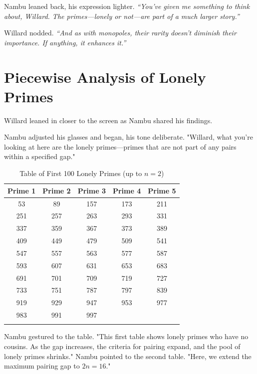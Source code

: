 Nambu leaned back, his expression lighter. \textit{``You’ve given me something to think about, Willard. The primes—lonely or not—are part of a much larger story.''}

Willard nodded. \textit{``And as with monopoles, their rarity doesn’t diminish their importance. If anything, it enhances it.''}


\section*{Piecewise Analysis of Lonely Primes}

Willard leaned in closer to the screen as Nambu shared his findings.

Nambu adjusted his glasses and began, his tone deliberate. "Willard, what you’re looking at here are the lonely primes—primes that are not part of any pairs within a specified gap."

\begin{longtable}{|c|c|c|c|c|}
\hline
\textbf{Prime 1} & \textbf{Prime 2} & \textbf{Prime 3} & \textbf{Prime 4} & \textbf{Prime 5} \\ \hline
53  & 89  & 157 & 173 & 211 \\ 
251 & 257 & 263 & 293 & 331 \\ 
337 & 359 & 367 & 373 & 389 \\ 
409 & 449 & 479 & 509 & 541 \\ 
547 & 557 & 563 & 577 & 587 \\ 
593 & 607 & 631 & 653 & 683 \\ 
691 & 701 & 709 & 719 & 727 \\ 
733 & 751 & 787 & 797 & 839 \\ 
919 & 929 & 947 & 953 & 977 \\ 
983 & 991 & 997 &      &     \\ \hline
\caption{Table of First 100 Lonely Primes (up to $n=2$)}
\end{longtable}

Nambu gestured to the table. "This first table shows lonely primes who have no cousins. As the gap increases, the criteria for pairing expand, and the pool of lonely primes shrinks." Nambu pointed to the second table. "Here, we extend the maximum pairing gap to \(2n = 16\)."

